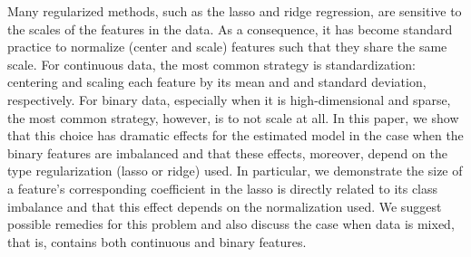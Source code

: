 Many regularized methods, such as the lasso and ridge regression, are sensitive to the
scales of the features in the data. As a consequence, it has become standard practice to
normalize (center and scale) features such that they share the same scale. For continuous
data, the most common strategy is standardization: centering and scaling each feature by
its mean and and standard deviation, respectively. For binary data, especially when it is
high-dimensional and sparse, the most common strategy, however, is to not scale at all. In
this paper, we show that this choice has dramatic effects for the estimated model in the
case when the binary features are imbalanced and that these effects, moreover, depend on
the type regularization (lasso or ridge) used. In particular, we demonstrate the size of a
feature's corresponding coefficient in the lasso is directly related to its class imbalance
and that this effect depends on the normalization used. We suggest possible remedies for
this problem and also discuss the case when data is mixed, that is, contains both
continuous and binary features.
